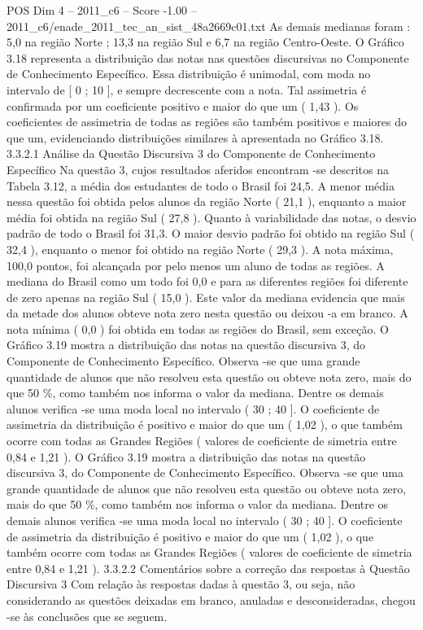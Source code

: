 \begin{textsample}{POS Dim 4 – 2011\_c6 – Score -1.00 – 2011\_c6/enade\_2011\_tec\_an\_sist\_48a2669c01.txt}
As demais medianas foram : 5,0 na região Norte ; 13,3 na região Sul e 6,7 na região Centro-Oeste.
O Gráfico 3.18 representa a distribuição das notas nas questões discursivas no Componente de Conhecimento Específico.
Essa distribuição é unimodal, com moda no intervalo de [ 0 ; 10 ], e sempre decrescente com a nota.
Tal assimetria é confirmada por um coeficiente positivo e maior do que um ( 1,43 ).
Os coeficientes de assimetria de todas as regiões são também positivos e maiores do que um, evidenciando distribuições similares à apresentada no Gráfico 3.18. 3.3.2.1 Análise da Questão Discursiva 3 do Componente de Conhecimento Específico Na questão 3, cujos resultados aferidos encontram -se descritos na Tabela 3.12, a média dos estudantes de todo o Brasil foi 24,5.
A menor média nessa questão foi obtida pelos alunos da região Norte ( 21,1 ), enquanto a maior média foi obtida na região Sul ( 27,8 ).
Quanto à variabilidade das notas, o desvio padrão de todo o Brasil foi 31,3.
O maior desvio padrão foi obtido na região Sul ( 32,4 ), enquanto o menor foi obtido na região Norte ( 29,3 ).
A nota máxima, 100,0 pontos, foi alcançada por pelo menos um aluno de todas as regiões.
A mediana do Brasil como um todo foi 0,0 e para as diferentes regiões foi diferente de zero apenas na região Sul ( 15,0 ).
Este valor da mediana evidencia que mais da metade dos alunos obteve nota zero nesta questão ou deixou -a em branco.
A nota mínima ( 0,0 ) foi obtida em todas as regiões do Brasil, sem exceção.
O Gráfico 3.19 mostra a distribuição das notas na questão discursiva 3, do Componente de Conhecimento Específico.
Observa -se que uma grande quantidade de alunos que não resolveu esta questão ou obteve nota zero, mais do que 50 \%, como também nos informa o valor da mediana.
Dentre os demais alunos verifica -se uma moda local no intervalo ( 30 ; 40 ].
O coeficiente de assimetria da distribuição é positivo e maior do que um ( 1,02 ), o que também ocorre com todas as Grandes Regiões ( valores de coeficiente de simetria entre 0,84 e 1,21 ).
O Gráfico 3.19 mostra a distribuição das notas na questão discursiva 3, do Componente de Conhecimento Específico.
Observa -se que uma grande quantidade de alunos que não resolveu esta questão ou obteve nota zero, mais do que 50 \%, como também nos informa o valor da mediana.
Dentre os demais alunos verifica -se uma moda local no intervalo ( 30 ; 40 ].
O coeficiente de assimetria da distribuição é positivo e maior do que um ( 1,02 ), o que também ocorre com todas as Grandes Regiões ( valores de coeficiente de simetria entre 0,84 e 1,21 ). 3.3.2.2 Comentários sobre a correção das respostas à Questão Discursiva 3 Com relação às respostas dadas à questão 3, ou seja, não considerando as questões deixadas em branco, anuladas e desconsideradas, chegou -se às conclusões que se seguem.

\end{textsample}
